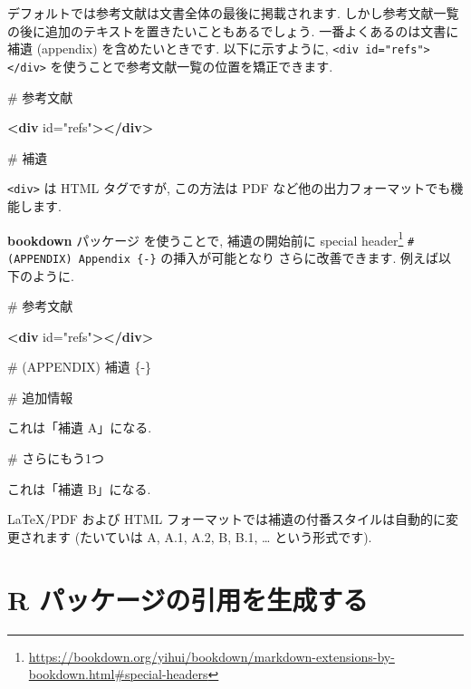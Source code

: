 \documentclass[
  11pt,
]{bxjsreport}
\newenvironment{Shaded}{\begin{snugshade}}{\end{snugshade}}
\newcommand{\FunctionTok}[1]{\textcolor[rgb]{0.00,0.00,0.00}{#1}}
\newcommand{\KeywordTok}[1]{\textcolor[rgb]{0.13,0.29,0.53}{\textbf{#1}}}
\newcommand{\NormalTok}[1]{#1}
\newcommand{\OtherTok}[1]{\textcolor[rgb]{0.56,0.35,0.01}{#1}}
\newcommand{\StringTok}[1]{\textcolor[rgb]{0.31,0.60,0.02}{#1}}
\renewcommand{\href}[2]{#2\footnote{\url{#1}}}
\begin{document}
デフォルトでは参考文献は文書全体の最後に掲載されます. しかし参考文献一覧の後に追加のテキストを置きたいこともあるでしょう. 一番よくあるのは文書に補遺 (appendix) を含めたいときです. 以下に示すように, \texttt{\textless{}div\ id="refs"\textgreater{}\textless{}/div\textgreater{}} を使うことで参考文献一覧の位置を矯正できます.

\begin{Shaded}
\begin{Highlighting}[]
\FunctionTok{\# 参考文献}

\KeywordTok{\textless{}div}\OtherTok{ id=}\StringTok{"refs"}\KeywordTok{\textgreater{}\textless{}/div\textgreater{}}

\FunctionTok{\# 補遺}
\end{Highlighting}
\end{Shaded}

\texttt{\textless{}div\textgreater{}} は HTML タグですが, この方法は PDF など他の出力フォーマットでも機能します.

\textbf{bookdown} パッケージ \autocite{R-bookdown} を使うことで, 補遺の開始前に \href{https://bookdown.org/yihui/bookdown/markdown-extensions-by-bookdown.html\#special-headers}{special header} \texttt{\# (APPENDIX) Appendix \{-\}} の挿入が可能となり さらに改善できます. 例えば以下のように.

\begin{Shaded}
\begin{Highlighting}[]
\FunctionTok{\# 参考文献}

\KeywordTok{\textless{}div}\OtherTok{ id=}\StringTok{"refs"}\KeywordTok{\textgreater{}\textless{}/div\textgreater{}}

\FunctionTok{\# (APPENDIX) 補遺 \{{-}\} }

\FunctionTok{\# 追加情報}

\NormalTok{これは「補遺 A」になる.}

\FunctionTok{\# さらにもう1つ}

\NormalTok{これは「補遺 B」になる.}
\end{Highlighting}
\end{Shaded}

LaTeX/PDF および HTML フォーマットでは補遺の付番スタイルは自動的に変更されます (たいていは A, A.1, A.2, B, B.1, \ldots{} という形式です).

\hypertarget{write-bib}{%
\section{R パッケージの引用を生成する}\label{write-bib}}
\end{document}

